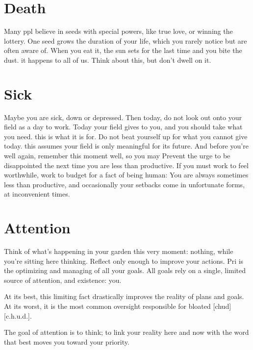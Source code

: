 \documentclass[
]{book}
\begin{document}
\section{Death}\label{death}

Many ppl believe in seeds with special powers, like true love, or winning the lottery.
One seed grows the duration of your life, which you rarely notice but are often aware of.
When you eat it, the sun sets for the last time and you bite the dust. it happens to all of us.
Think about this, but don't dwell on it.

\section{Sick}\label{sick}

Maybe you are sick, down or depressed.
Then today, do not look out onto your field as a day to work.
Today your field gives to you, and you should take what you need. this is what it is for.
Do not beat yourself up for what you cannot give today. this assumes your field is only meaningful for its future.
And before you're well again, remember this moment well, so you may
Prevent the urge to be disappointed the next time you are less than productive.
If you must work to feel worthwhile, work to budget for a fact of being human:
You are always sometimes less than productive, and occasionally your setbacks come in unfortunate forms, at inconvenient times.

\section{Attention}\label{attention}

Think of what's happening in your garden this very moment: nothing, while you're sitting here thinking.
Reflect only enough to improve your actions.
Pri is the optimizing and managing of all your goals.
All goals rely on a single, limited source of attention, and existence: you.

At its best, this limiting fact drastically improves the reality of plans and goals.
At its worst, it is the most common oversight responsible for bloated {[}chud{]}{[}c.h.u.d.{]}.

The goal of attention is to think; to link your reality here and now with the word that best moves you toward your priority.
\end{document}
